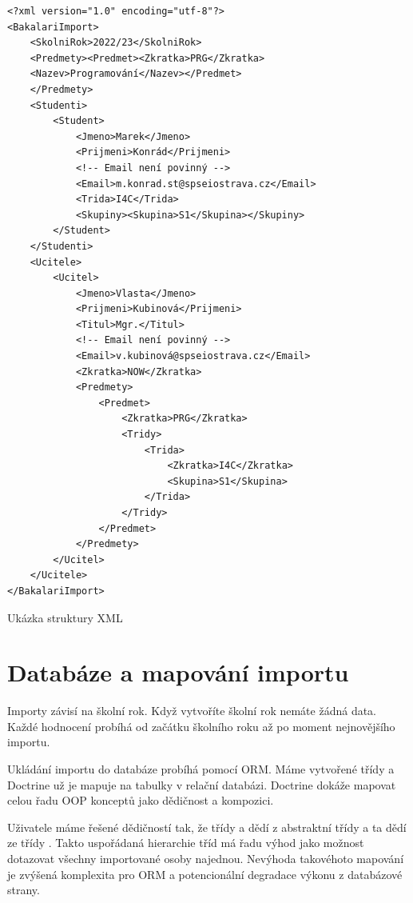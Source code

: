 \begin{code}[H]
  \begin{verbatim}
<?xml version="1.0" encoding="utf-8"?>
<BakalariImport>
    <SkolniRok>2022/23</SkolniRok>
    <Predmety><Predmet><Zkratka>PRG</Zkratka>
    <Nazev>Programování</Nazev></Predmet>
    </Predmety>
    <Studenti>
        <Student>
            <Jmeno>Marek</Jmeno>
            <Prijmeni>Konrád</Prijmeni>
            <!-- Email není povinný -->
            <Email>m.konrad.st@spseiostrava.cz</Email>
            <Trida>I4C</Trida>
            <Skupiny><Skupina>S1</Skupina></Skupiny>
        </Student>
    </Studenti>
    <Ucitele>
        <Ucitel>
            <Jmeno>Vlasta</Jmeno>
            <Prijmeni>Kubinová</Prijmeni>
            <Titul>Mgr.</Titul>
            <!-- Email není povinný -->
            <Email>v.kubinová@spseiostrava.cz</Email>
            <Zkratka>NOW</Zkratka>
            <Predmety>
                <Predmet>
                    <Zkratka>PRG</Zkratka>
                    <Tridy>
                        <Trida>
                            <Zkratka>I4C</Zkratka>
                            <Skupina>S1</Skupina>
                        </Trida>
                    </Tridy>
                </Predmet>
            </Predmety>
        </Ucitel>       
    </Ucitele>
</BakalariImport>
\end{verbatim}
\caption{Ukázka struktury XML}
\end{code}


\section{Databáze a mapování importu}

Importy závisí na školní rok. Když vytvoříte školní rok nemáte žádná data. Každé hodnocení probíhá od začátku školního roku až po moment nejnovějšího importu.

Ukládání importu do databáze probíhá pomocí ORM. Máme vytvořené třídy a Doctrine už je mapuje na tabulky v relační databázi. Doctrine dokáže mapovat celou řadu OOP konceptů jako dědičnost a kompozici.

Uživatele máme řešené dědičností tak, že třídy  a  dědí z abstraktní třídy  a ta dědí ze třídy . Takto uspořádaná hierarchie tříd má řadu výhod jako možnost dotazovat všechny importované osoby najednou.  Nevýhoda takovéhoto mapování je zvýšená komplexita pro ORM a potencionální degradace výkonu z databázové strany.

